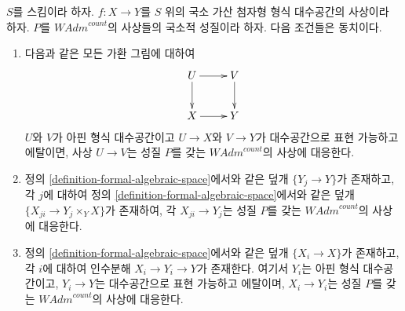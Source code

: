 \begin{lemma}
\label{lemma-property-defines-property-morphisms}
$S$를 스킴이라 하자. $f : X \to Y$를 $S$ 위의 국소 가산 첨자형
형식 대수공간의 사상이라 하자. $P$를 $\textit{WAdm}^{count}$의
사상들의 국소적 성질이라 하자. 다음 조건들은 동치이다.
\begin{enumerate}
\item 다음과 같은 모든 가환 그림에 대하여
$$
\xymatrix{
U \ar[d] \ar[r] & V \ar[d] \\
X \ar[r] & Y
}
$$
$U$와 $V$가 아핀 형식 대수공간이고 $U \to X$와 $V \to Y$가
대수공간으로 표현 가능하고 에탈이면, 사상 $U \to V$는 성질
$P$를 갖는 $\textit{WAdm}^{count}$의 사상에 대응한다.
\item 정의 \ref{definition-formal-algebraic-space}에서와 같은 덮개
$\{Y_j \to Y\}$가 존재하고, 각 $j$에 대하여 정의
\ref{definition-formal-algebraic-space}에서와 같은 덮개
$\{X_{ji} \to Y_j \times_Y X\}$가 존재하여, 각
$X_{ji} \to Y_j$는 성질 $P$를 갖는 $\textit{WAdm}^{count}$의
사상에 대응한다.
\item 정의 \ref{definition-formal-algebraic-space}에서와 같은 덮개
$\{X_i \to X\}$가 존재하고, 각 $i$에 대하여 인수분해
$X_i \to Y_i \to Y$가 존재한다. 여기서 $Y_i$는 아핀 형식
대수공간이고, $Y_i \to Y$는 대수공간으로 표현 가능하고 에탈이며,
$X_i \to Y_i$는 성질 $P$를 갖는 $\textit{WAdm}^{count}$의 사상에
대응한다.
\end{enumerate}
\end{lemma}

